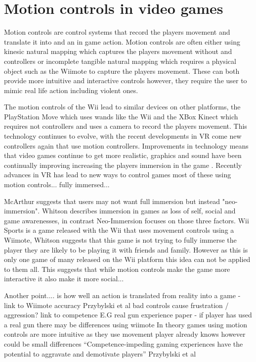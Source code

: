 \documentclass{scrartcl}
\begin{document}
\bigskip

\section{Motion controls in video games}
Motion controls are control systems that record the players movement and translate it into and an in game action. Motion controls are often either using kinesic natural mapping which captures the players movement without and controllers or incomplete tangible natural mapping which requires a physical object such as the Wiimote to capture the players movement.  \cite{McEwan2012}
These can both provide more intuitive and interactive controls however, they require the user to mimic real life action including violent ones. \cite{Kim} 




\bigskip
The motion controls of the Wii lead to similar devices on other platforms, the PlayStation Move which uses wands 
like the Wii and the XBox Kinect which requires not controllers and uses a camera to record the players movement.
This technology continues to evolve, with the recent developments in VR come new controllers again that use motion controllers. 
\bigskip
Improvements in technology means that video games continue to get more realistic, graphics and sound have been continually improving increasing the players immersion in the game \cite{Kim}. Recently advances in VR has lead to new ways to control games most of these using motion controls... fully immersed...
 \bigskip

McArthur suggests that users may not want full immersion but instead "neo-immersion". \cite{McArthur} Whitson describes immersion in games as loss of  self, social and game awarenesses, in contrast Neo-Immersion focuses on those three factors. \cite{Whitson} Wii Sports is a game released with the Wii that uses movement controls using a Wiimote, Whitson suggests that this game is not trying to fully immerse the player they are likely to be playing it with friends and family. However as this is only one game of many released on the Wii platform this idea can not be applied to them all. 
This suggests that while motion controls make the game more interactive it also make it more social...
\bigskip


Another point.... is how well an action is translated from reality into a game  - link to Wiimote accuracy
Przybylski et al \cite{przybylski} bad controls cause frustration / aggression? link to competence
E.G real gun experience paper - if player has used a real gun there may be differences using wiimote
\bigskip
In theory games using motion controls are more intuitive as they use movement player already knows however could be small differences 
\bigskip
“Competence-impeding gaming experiences have the potential to aggravate and demotivate players”  Przybylski et al \cite{przybylski}
\end{document}
